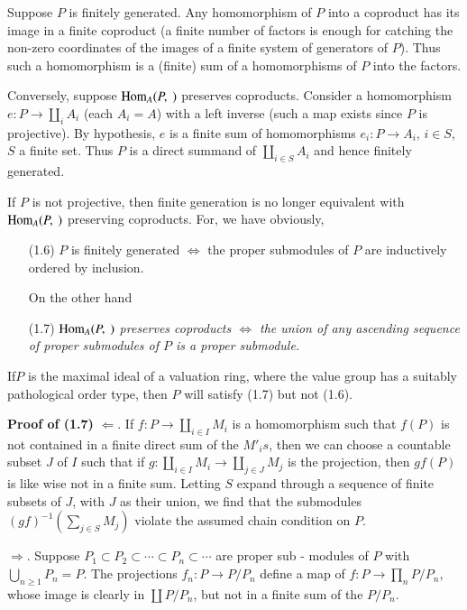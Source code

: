 Suppose $P$ is finitely generated. Any homomorphism of $P$ into a
coproduct has its image in a finite coproduct (a finite number of
factors is enough for catching the non-zero coordinates of the images
of a finite system of generators of $P$). Thus such a homomorphism is a
(finite) sum of a homomorphisms of $P$ into the factors.  

Conversely, suppose $\operatorname{Hom}_A(P,~)$ preserves coproducts. Consider a
homomorphism $e : P \to \coprod \limits_i A_i$ (each $A_i = A$) with a
left inverse (such a map exists since $P$ is projective). By
hypothesis, $e$ is a finite sum of homomorphisms $e_i : P \to A_i$,
$i \in S$, $S$ a finite set. Thus $P$ is a direct summand of
$\coprod\limits_{i\in S} A_i$ and hence finitely generated.  

\begin{remark*}%
If $P$ is not projective, then finite generation is no longer
equivalent with $\operatorname{Hom}_A (P, ~)$  preserving coproducts. For, we have
obviously,  
\end{remark*}
\begin{itemize}
 \item [(1.6)] $P$ is finitely generated $\Leftrightarrow$ the proper
   submodules of $P$ are inductively ordered by inclusion. 

On the other hand

\item [(1.7)]  {\em  $\operatorname{Hom}_A (P,~ )$ preserves coproducts
  $\Leftrightarrow$ the union of any ascending sequence of proper
  submodules of $P$ is a proper submodule.}  
\end{itemize}


If\pageoriginale $P$ is the maximal ideal of a valuation ring, where
the value group has a suitably pathological order type, then $P$ will
satisfy (1.7) but not (1.6).  

\noindent
\textbf{Proof of (1.7)} $\Leftarrow$. If $f : P \to \coprod \limits_{
  i \in I}M_i$  is a homomorphism such that $f(P)$ is not contained in
a finite direct sum of the $M'_is$, then we can choose a countable
subset $J$ of $I$ such that if $g : \coprod\limits_{i \in I} M_i \to
\coprod\limits_{j \in J}M_j$ is the projection, then $gf(P)$ is like wise
not in a finite sum. Letting $S$ expand through a sequence of finite
subsets of $J$, with $J$ as their union, we find that the submodules
$(gf)^{-1}(\sum\limits_{j \in S}M_j )$ violate the assumed chain
condition on $P$.  

$\Rightarrow$. Suppose $P_1 \subset P_2  \subset \cdots \subset P_n
\subset \cdots$ are proper sub - modules of $P$ with $\bigcup\limits_{
  n \geq 1} P_n = P$. The projections $f_n: P \to P/ P_n$ define a map
of $f : P \to \prod\limits_n P / P_n$, whose image is clearly in
$\coprod P / P_n$, but not in a finite sum of the $P/ P_n$. 

